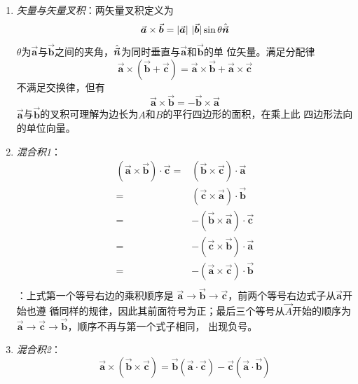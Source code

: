 \begin{enumerate}
    \item \textit{矢量与矢量叉积}：两矢量叉积定义为
          \begin{equation}
              \vec{\bm{a}} \times \vec{\bm{b}} = |\vec{\bm{a}}|\ |\vec{\bm{b}}|\sin{\theta} \hat{\vec{\bm{n}}}
            \label{eq:vec-vec-cross}
          \end{equation}
          $\theta$为$\vec{\bm{a}}$与$\vec{\bm{b}}$之间的夹角，$\hat{\vec{\bm{n}}}$为同时垂直与$\vec{\bm{a}}$和$\vec{\bm{b}}$的单
          位矢量。满足分配律
          \begin{equation}
              \vec{\bm{a}} \times(\vec{\bm{b}} + \vec{\bm{c}}) = \vec{\bm{a}} \times \vec{\bm{b}} + \vec{\bm{a}} \times \vec{\bm{c}}
                                            \label{eq:vec-vec-cross-distri}
          \end{equation}
          不满足交换律，但有
          \begin{equation}
              \vec{\bm{a}} \times \vec{\bm{b}} = - \vec{\bm{b}} \times \vec{\bm{a}}
            \label{eq:vec-vec-cross-exchange}
          \end{equation}
          $\vec{\bm{a}}$与$\vec{\bm{b}}$的叉积可理解为边长为$A$和$B$的平行四边形的面积，在乘上此
          四边形法向的单位向量。
      \item \textit{混合积1}：
            \begin{equation}
                \begin{aligned}
                    (\vec{\bm{a}} \times \vec{\bm{b}}) \cdot \vec{\bm{c}} 
                                        =& (\vec{\bm{b}} \times \vec{\bm{c}}) \cdot \vec{\bm{a}} \\
                                        =& (\vec{\bm{c}} \times \vec{\bm{a}}) \cdot \vec{\bm{b}} \\
                                        =&-(\vec{\bm{b}} \times \vec{\bm{a}}) \cdot \vec{\bm{c}} \\
                                        =&-(\vec{\bm{c}} \times \vec{\bm{b}}) \cdot \vec{\bm{a}} \\
                                        =&-(\vec{\bm{a}} \times \vec{\bm{c}}) \cdot \vec{\bm{b}} \\
                \end{aligned}
                \label{eq:vec-vec-vec-mix1}
            \end{equation}
            ：上式第一个等号右边的乘积顺序是
            $\vec{\bm{a}} \rightarrow \vec{\bm{b}} \rightarrow \vec{\bm{c}}$，前两个等号右边式子从$\vec{\bm{a}}$开始也遵
            循同样的规律，因此其前面符号为正；最后三个等号从$\vec{A}$开始的顺序为
            $\vec{\bm{a}} \rightarrow \vec{\bm{c}} \rightarrow \vec{\bm{b}}$，顺序不再与第一个式子相同，
            出现负号。
      \item \textit{混合积2}：
          \begin{equation}
          \vec{\bm{a}} \times (\vec{\bm{b}} \times \vec{\bm{c}}) = \vec{\bm{b}}(\vec{\bm{a}} \cdot \vec{\bm{c}}) - \vec{\bm{c}}(\vec{\bm{a}} \cdot \vec{\bm{b}})
                                                        \label{eq:vec-vec-vec-mix2}
          \end{equation}
\end{enumerate}
